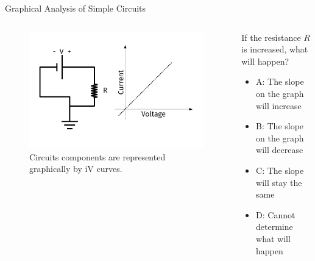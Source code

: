 \documentclass{beamer}
\begin{document}
\begin{frame}{Graphical Analysis of Simple Circuits}
\begin{columns}[T]
\begin{column}{0.5\textwidth}
\begin{figure}
\centering
\includegraphics[width=\textwidth,trim=0.5cm 0cm 1cm 0cm,clip=true]{figures/iVCurve.pdf}
\caption{\label{fig:iVCurve1} Circuits components are represented graphically by iV curves.}
\end{figure}
\end{column}
\begin{column}{0.5\textwidth}
\small
If the resistance $R$ is increased, what will happen?
\begin{itemize}
\item A: The slope on the graph will increase
\item B: The slope on the graph will decrease
\item C: The slope will stay the same
\item D: Cannot determine what will happen
\end{itemize}
\end{column}
\end{columns}
\end{frame}
\end{document}
